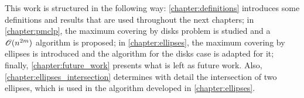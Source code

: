 This work is structured in the following way: \autoref{chapter:definitions} introduces some definitions and results that are used throughout the next chapters; in \autoref{chapter:pmclp}, the maximum covering by disks problem is studied and a $\mathscr{O}(n^{2m})$ algorithm is proposed; in \autoref{chapter:ellipses}, the maximum covering by ellipses is introduced and the algorithm for the disks case is adapted for it; finally, \autoref{chapter:future_work} presents what is left as future work. Also, \autoref{chapter:ellipses_intersection} determines with detail the intersection of two ellipses, which is used in the algorithm developed in \autoref{chapter:ellipses}.


